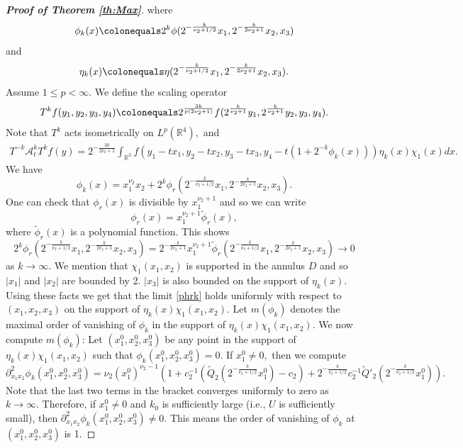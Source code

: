 \documentclass[a4paper, 11pt]{article}
\theoremstyle{plain}
\theoremstyle{definition}
\theoremstyle{lemma}
\theoremstyle{Remark}
\theoremstyle{proposition}
\theoremstyle{corollary}
\theoremstyle{example}
\theoremstyle{assumption}
\begin{document}
\begin{proof}[\textbf{Proof of Theorem \ref{th:Max}}]
where
\begin{eqnarray*}
\phi_k(x)\colonequals 2^k\phi(2^{-\frac{k}{\nu_2+1/2}}x_1, 2^{-\frac{k}{2\nu_2+1}}x_2,  x_3)
 \end{eqnarray*}
 and
\begin{eqnarray*}
 \eta_k(x)\colonequals \eta(2^{-\frac{k}{\nu_2+1/2}}x_1, 2^{-\frac{k}{2\nu_2+1}}x_2, x_3).
\end{eqnarray*}
Assume $1\le p<\infty.$ We define the scaling operator
\begin{eqnarray*}
T^kf(y_1, y_2, y_3, y_4)\colonequals 2^{\frac{3k}{p(2\nu_2+1)}} f(2^{\frac{k}{\nu_2+1}}y_1, 2^{\frac{k}{\nu_2+1}}y_2, y_3, y_4).
\end{eqnarray*}
Note that $T^k$ acts isometrically on $L^p(\mathbb{R}^4),$ and
\begin{eqnarray*}
T^{-k} \mathcal{A}_t^k T^kf(y)=2^{-\frac{3k}{2\nu_2+1}}\int_{\mathbb{R}^3}f(y_1-tx_1,y_2-tx_2,y_3-tx_3, y_4-t(1+ 2^{-k}\phi_k(x))) \eta_k(x)\chi_1(x)dx.
\end{eqnarray*}
We have
$$\phi_k(x)=x_1^{\nu_2}x_2+2^k\phi_r (2^{-\frac{k}{\nu_2+1/2}}x_1, 2^{-\frac{k}{2\nu_2+1}}x_2, x_3).$$
One can check that $\phi_r(x) $ is divisible by $x_1^{\nu_2+1}$ and so we can write  $$\phi_r(x)=x_1^{\nu_2+1}\tilde{\phi}_r(x),$$
where $\tilde{\phi}_r(x)$ is a polynomial function. This shows
\begin{equation}\label{phrk}
2^k\phi_r (2^{-\frac{k}{\nu_2+1/2}}x_1, 2^{-\frac{k}{2\nu_2+1}}x_2, x_3)=2^{-\frac{k}{2\nu_2+1}}x_1^{\nu_2+1}\tilde{\phi}_r (2^{-\frac{k}{\nu_2+1/2}}x_1, 2^{-\frac{k}{2\nu_2+1}}x_2, x_3)\to 0
\end{equation}
as $k\to \infty.$
We mention that    $\chi_1(x_1, x_2)$ is supported  in the annulus $D$ and so $|x_1|$ and $|x_2|$ are bounded by 2.  $|x_3| $ is also bounded on the support of $\eta_k(x)$.   Using these facts  we get that  the limit \eqref{phrk} holds uniformly with respect to $(x_1,  x_2, x_3)$ on the support of $\eta_k(x)\chi_1(x_1, x_2)$.
 Let $m(\phi_k)$ denotes the maximal order of vanishing of $\phi_k$ in the support of $\eta_k(x)\chi_1(x_1, x_2)$. We now compute $m(\phi_k)$:  Let  $(x_1^0, x_2^0, x_3^0)$ be any point in the support of $\eta_k(x)\chi_1(x_1, x_2)$ such that $\phi_k(x_1^0, x_2^0, x_3^0)=0.$ If $x_1^0\neq 0,$ then we compute
 $$\partial^2_{x_1x_2}\phi_k(x_1^0,x_2^0,x_3^0)
 =\nu_2(x_1^0)^{\nu_2-1}\left(1+{c_2^{-1}}(\tilde{Q}_2(2^{-\frac{k}{\nu_2+1/2}}x_1^0)-c_2)+2^{-\frac{k}{\nu_2+1/2}}c_2^{-1}\tilde{Q}'_2(2^{-\frac{k}{\nu_2+1/2}}x_1^0)\right).$$
Note that the last two terms in the bracket converges uniformly to zero as $k\to \infty.$  Therefore, if $x_1^0\neq 0$ and $k_0$ is sufficiently large (i.e., $U$ is sufficiently small), then $ \partial^2_{x_1x_2}\phi_k(x_1^0,x_2^0,x_3^0)\neq 0.$ This means the order of vanishing of $\phi_k$ at $(x_1^0, x_2^0, x_3^0)$ is 1.

\end{proof}
\end{document}
